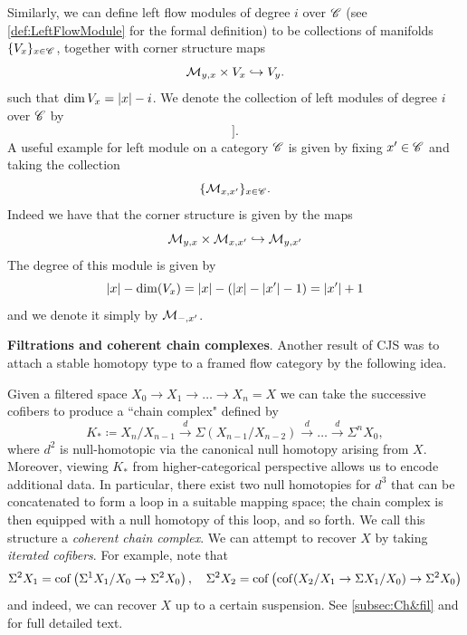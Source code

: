 Similarly, we can define left flow modules of degree $i$ over $\mathscr{C}$ (see \cref{def:LeftFlowModule} for the formal definition) to be collections of manifolds $\{V_x\}_{x \in \mathscr{C}}$, together with corner structure maps
\begin{equation*}
    \mathcal{M}_{y,x} \times V_x \hookrightarrow V_y.
\end{equation*}
such that $\dim V_x = \left\lvert x\right\rvert - i$. We denote the collection of left modules of degree $i$ over $\mathscr{C}$ by 
\begin{equation*}
    [\fC, *[i]].
\end{equation*}
A useful example for left module on a category $\mathscr{C}$ is given by fixing $x' \in \mathscr{C}$ and taking the collection
\begin{equation}
    \{\mathcal{M}_{x,x'}\}_{x \in \mathscr{C}}.
\end{equation}
Indeed we have that the corner structure is given by the maps
\begin{equation*}
    \mathcal{M}_{y,x} \times \mathcal{M}_{x,x'} \hookrightarrow \mathcal{M}_{y,x'} 
\end{equation*}
The degree of this module is given by
\begin{equation*}
    \left\lvert x\right\rvert - \dim (V_x) = \left\lvert x\right\rvert - (\left\lvert x\right\rvert - \left\lvert x'\right\rvert - 1) = \left\lvert x'\right\rvert + 1
\end{equation*}
and we denote it simply by $\mathcal{M}_{-,x'}$.


\textbf{Filtrations and coherent chain complexes}. Another result of CJS was to attach a stable homotopy type to a framed flow category by the following idea.

Given a filtered space $X_0 \to X_1 \to \dots \to X_n = X$ we can take the successive cofibers to produce a ``chain complex" defined by
\begin{equation*}
    K_* \coloneq X_n/X_{n-1} \xrightarrow{d} \Sigma (X_{n-1}/X_{n-2}) \xrightarrow{d} \dots \xrightarrow{d} \Sigma^{n} X_0,
\end{equation*}
where $d^2$ is null-homotopic via the canonical null homotopy arising from $X$. Moreover, viewing $K_*$ from higher-categorical perspective allows us to encode additional data. In particular, there exist two null homotopies for $d^3$ that can be concatenated to form a loop in a suitable mapping space; the chain complex is then equipped with a null homotopy of this loop, and so forth. We call this structure a \emph{coherent chain complex}.
We can attempt to recover $X$ by taking \emph{iterated cofibers}. For example, note that
\begin{equation*}
    \Sigma^2 X_1 = \operatorname{cof} \left (\Sigma^1 X_1/X_0 \to \Sigma^2 X_0 \right ), \quad \Sigma^2 X_2 = \operatorname{cof} \left (\operatorname{cof} (X_2 / X_1 \to \Sigma X_1/X_0) \to \Sigma^2 X_0 \right )
\end{equation*}
and indeed, we can recover $X$ up to a certain suspension. See \cref{subsec:Ch&fil} and \cite{Ari21} for full detailed text.

